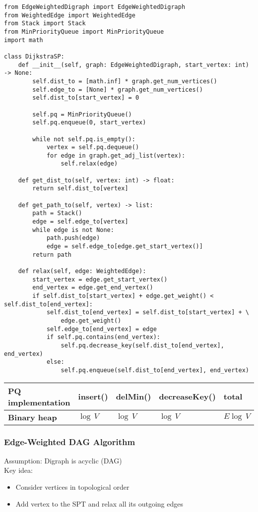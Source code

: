 \documentclass[a4paper]{article}
\begin{document}
\begin{lstlisting}
from EdgeWeightedDigraph import EdgeWeightedDigraph
from WeightedEdge import WeightedEdge
from Stack import Stack
from MinPriorityQueue import MinPriorityQueue
import math

class DijkstraSP:
    def __init__(self, graph: EdgeWeightedDigraph, start_vertex: int) -> None:
        self.dist_to = [math.inf] * graph.get_num_vertices()
        self.edge_to = [None] * graph.get_num_vertices()
        self.dist_to[start_vertex] = 0

        self.pq = MinPriorityQueue()
        self.pq.enqueue(0, start_vertex)

        while not self.pq.is_empty():
            vertex = self.pq.dequeue()
            for edge in graph.get_adj_list(vertex):
                self.relax(edge)

    def get_dist_to(self, vertex: int) -> float:
        return self.dist_to[vertex]

    def get_path_to(self, vertex) -> list:
        path = Stack()
        edge = self.edge_to[vertex]
        while edge is not None:
            path.push(edge)
            edge = self.edge_to[edge.get_start_vertex()]
        return path

    def relax(self, edge: WeightedEdge):
        start_vertex = edge.get_start_vertex()
        end_vertex = edge.get_end_vertex()
        if self.dist_to[start_vertex] + edge.get_weight() < self.dist_to[end_vertex]:
            self.dist_to[end_vertex] = self.dist_to[start_vertex] + \
                edge.get_weight()
            self.edge_to[end_vertex] = edge
            if self.pq.contains(end_vertex):
                self.pq.decrease_key(self.dist_to[end_vertex], end_vertex)
            else:
                self.pq.enqueue(self.dist_to[end_vertex], end_vertex)
\end{lstlisting}

\begin{spacing}{1.5}
\begin{tabularx}{1\textwidth}{|X|X|X|X|X|}
    \hline
    \textbf{\color{blue}PQ implementation}&\textbf{insert()} & \textbf{delMin()}& \textbf{decreaseKey()}&\textbf{total} \\
    \hline
    \textbf{Binary heap}&$\log\,V$&$\log\,V$&$\log\,V$&$E\log\,V$\\
    \hline
\end{tabularx}
\end{spacing}

\subsubsection*{Edge-Weighted DAG Algorithm}
Assumption: Digraph is acyclic (DAG)\\
Key idea:
\begin{itemize}
    \item Consider vertices in topological order
    \item Add vertex to the SPT and relax all its outgoing edges
\end{itemize}
\end{document}
